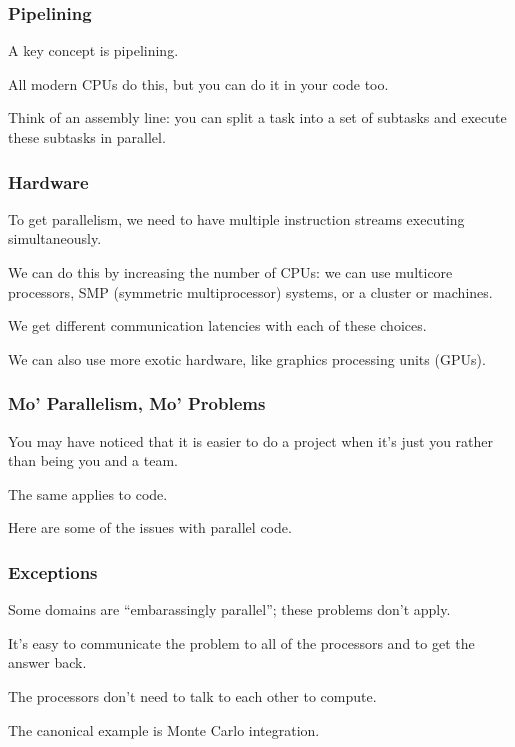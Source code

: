 \begin{frame}
\frametitle{Pipelining}

A key concept is pipelining. 

All modern CPUs do this,
but you can do it in your code too. 

Think of an assembly line: you can split
a task into a set of subtasks and execute these subtasks in parallel.


\end{frame}




\begin{frame}
\frametitle{Hardware}

To get parallelism, we need to have multiple instruction
streams executing simultaneously. 

We can do this by increasing the
number of CPUs: we can use multicore processors, SMP (symmetric
multiprocessor) systems, or a cluster or machines. 

We get different
communication latencies with each of these choices.

We can also use more exotic hardware, like graphics processing units
(GPUs).

\end{frame}



\begin{frame}
\frametitle{Mo' Parallelism, Mo' Problems}
You may have noticed that it is easier to do a project when it's just
you rather than being you and a team. 

The same applies to code.

Here are some of the issues with parallel code.


\end{frame}



\begin{frame}
\frametitle{Exceptions}

Some domains are ``embarassingly parallel''; these problems
don't apply. 

It's easy to communicate the problem to all of the processors and to get the answer back.
 
The processors don't need to talk to each other to compute. 

The canonical
example is Monte Carlo integration.


\end{frame}



